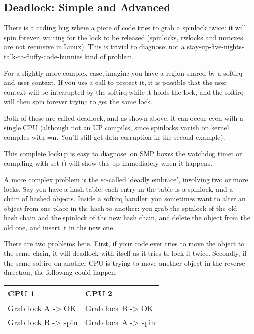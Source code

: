 \documentclass[a4paper,8pt,english]{sphinxmanual}
\begin{document}
\subsection{Deadlock: Simple and Advanced}
\label{kernel-hacking/locking:deadlock-simple-and-advanced}
There is a coding bug where a piece of code tries to grab a spinlock
twice: it will spin forever, waiting for the lock to be released
(spinlocks, rwlocks and mutexes are not recursive in Linux). This is
trivial to diagnose: not a
stay-up-five-nights-talk-to-fluffy-code-bunnies kind of problem.

For a slightly more complex case, imagine you have a region shared by a
softirq and user context. If you use a  call
to protect it, it is possible that the user context will be interrupted
by the softirq while it holds the lock, and the softirq will then spin
forever trying to get the same lock.

Both of these are called deadlock, and as shown above, it can occur even
with a single CPU (although not on UP compiles, since spinlocks vanish
on kernel compiles with =n. You'll still get data
corruption in the second example).

This complete lockup is easy to diagnose: on SMP boxes the watchdog
timer or compiling with  set
() will show this up immediately when it
happens.

A more complex problem is the so-called `deadly embrace', involving two
or more locks. Say you have a hash table: each entry in the table is a
spinlock, and a chain of hashed objects. Inside a softirq handler, you
sometimes want to alter an object from one place in the hash to another:
you grab the spinlock of the old hash chain and the spinlock of the new
hash chain, and delete the object from the old one, and insert it in the
new one.

There are two problems here. First, if your code ever tries to move the
object to the same chain, it will deadlock with itself as it tries to
lock it twice. Secondly, if the same softirq on another CPU is trying to
move another object in the reverse direction, the following could
happen:

\begin{tabulary}{\linewidth}{|L|L|}
\hline
\textsf{\relax 
CPU 1
} & \textsf{\relax 
CPU 2
}\\
\hline
Grab lock A -\textgreater{} OK
 & 
Grab lock B -\textgreater{} OK
\\
\hline
Grab lock B -\textgreater{} spin
 & 
Grab lock A -\textgreater{} spin
\\
\hline\end{tabulary}
\end{document}
